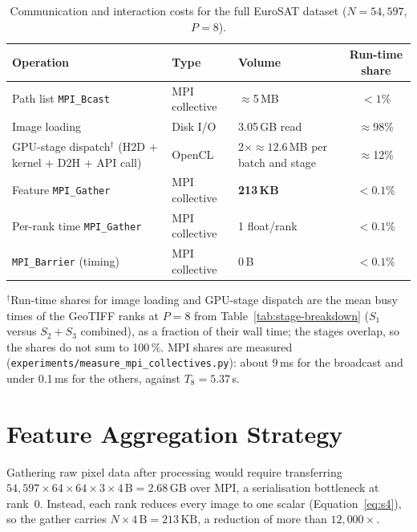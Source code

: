 \documentclass[a4paper,12pt]{report}
\begin{document}
\begin{table}[H]
\centering
\caption{Communication and interaction costs for the full EuroSAT dataset
($N=54{,}597$, $P=8$).}
\label{tab:comm-costs}
\begin{tabular}{@{}p{4.9cm}p{2.7cm}p{2.5cm}c@{}}
\toprule
\textbf{Operation} & \textbf{Type} & \textbf{Volume} &
\textbf{Run-time share} \\
\midrule
Path list \texttt{MPI\_\discretionary{}{}{}Bcast} & MPI collective & $\approx$5\,MB &
  ${<}1\%$ \\[3pt]
Image loading & Disk I/O         & 3.05\,GB read & $\approx$98\% \\[3pt]
GPU-stage dispatch$^{\dagger}$ (H2D + kernel + D2H + API call) & OpenCL & \parbox[t]{2.5cm}{\raggedright $2\times{\approx}12.6$\,MB per batch and stage\strut} &
  $\approx$12\% \\[3pt]
Feature \texttt{MPI\_\discretionary{}{}{}Gather}   & MPI collective & \textbf{213\,KB} &
  ${<}0.1\%$ \\[3pt]
Per-rank time \texttt{MPI\_\discretionary{}{}{}Gather} & MPI collective & 1 float/rank &
  ${<}0.1\%$ \\[3pt]
\texttt{MPI\_\discretionary{}{}{}Barrier} (timing) & MPI collective & 0\,B &
  ${<}0.1\%$ \\
\bottomrule
\end{tabular}
\vspace{2pt}
\footnotesize $^{\dagger}$Run-time shares for image loading and GPU-stage
dispatch are the mean busy times of the GeoTIFF ranks at $P{=}8$ from
Table~\ref{tab:stage-breakdown} ($S_1$ versus $S_2{+}S_3$ combined), as
a fraction of their wall time; the stages overlap, so the shares do not sum to
100\,\%. MPI shares are measured
(\texttt{experiments\slash{}measure\_\discretionary{}{}{}mpi\_\discretionary{}{}{}collectives.py}): about 9\,ms for the
broadcast and under 0.1\,ms for the others, against $T_8 = 5.37$\,s.
\end{table}

\section{Feature Aggregation Strategy}
\label{sec:aggregation}

Gathering raw pixel data after processing would require transferring
$54{,}597 \times 64 \times 64 \times 3 \times 4\,\mathrm{B} = 2.68\,\mathrm{GB}$
over MPI, a serialisation bottleneck at rank~0. Instead, each rank reduces every
image to one scalar (Equation~\eqref{eq:s4}), so the gather carries
$N \times 4\,\mathrm{B} = 213\,\mathrm{KB}$, a reduction of more than $12{,}000\times$.
\end{document}
